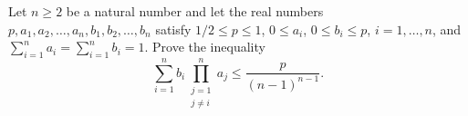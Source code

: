Let $n \geq 2$ be a natural number and let the real numbers $p, a_1, a_2, \ldots, a_n, b_1, b_2, \ldots, b_n$ satisfy $1/2 \leq p \leq 1$, $0 \leq a_i$, $0 \leq b_i \leq p$, $i = 1, \ldots, n$, and $\sum_{i=1}^{n} a_i = \sum_{i=1}^{n} b_i = 1$. Prove the inequality
\[ \sum_{i=1}^{n} b_i \prod_{\substack{j=1 \\ j \neq i}}^{n} a_j \leq \frac{p}{(n-1)^{n-1}}. \]
